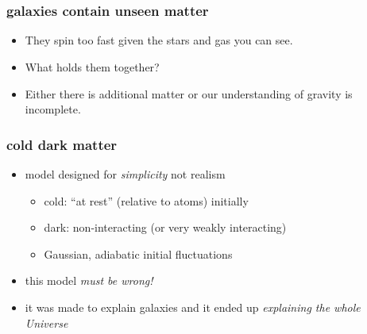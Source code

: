 \documentclass{beamer}
\begin{document}
{\begin{frame}[plain]~\end{frame}}

{\begin{frame}[plain]~\end{frame}}

\begin{frame}
  \frametitle{galaxies contain unseen matter}
  \begin{itemize}
  \item They spin too fast given the stars and gas you can see.
  \item What holds them together?
  \item Either there is additional matter or our understanding of gravity is incomplete.
  \end{itemize}
\end{frame}

\begin{frame}
\frametitle{cold dark matter}
\begin{itemize}
\item model designed for \emph{simplicity} not realism
  \begin{itemize}
  \item cold: ``at rest'' (relative to atoms) initially
  \item dark: non-interacting (or very weakly interacting)
  \item Gaussian, adiabatic initial fluctuations
  \end{itemize}
\item this model \emph{must be wrong!}
\item it was made to explain galaxies and it ended up \emph{explaining the whole Universe}
\end{itemize}
\end{frame}

{\begin{frame}[plain]~\end{frame}}

{\begin{frame}[plain]~\end{frame}}
\end{document}
